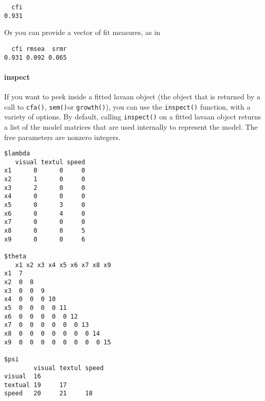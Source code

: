 \begin{verbatim}
  cfi 
0.931 
\end{verbatim}

Or you can provide a vector of fit measures, as in

\begin{Shaded}
\begin{Highlighting}[]
\NormalTok{(}\NormalTok{,}\NormalTok{,}\NormalTok{))}
\end{Highlighting}
\end{Shaded}

\begin{verbatim}
  cfi rmsea  srmr 
0.931 0.092 0.065 
\end{verbatim}

\hypertarget{inspect}{%
\paragraph{inspect}\label{inspect}}

If you want to peek inside a fitted lavaan object (the object that is
returned by a call to \texttt{cfa()}, \texttt{sem()}or
\texttt{growth()}), you can use the \texttt{inspect()} function, with a
variety of options. By default, calling \texttt{inspect()} on a fitted
lavaan object returns a list of the model matrices that are used
internally to represent the model. The free parameters are nonzero
integers.

\begin{Shaded}
\begin{Highlighting}[]
\StringTok{ }
\end{Highlighting}
\end{Shaded}

\begin{verbatim}
$lambda
   visual textul speed
x1      0      0     0
x2      1      0     0
x3      2      0     0
x4      0      0     0
x5      0      3     0
x6      0      4     0
x7      0      0     0
x8      0      0     5
x9      0      0     6

$theta
   x1 x2 x3 x4 x5 x6 x7 x8 x9
x1  7                        
x2  0  8                     
x3  0  0  9                  
x4  0  0  0 10               
x5  0  0  0  0 11            
x6  0  0  0  0  0 12         
x7  0  0  0  0  0  0 13      
x8  0  0  0  0  0  0  0 14   
x9  0  0  0  0  0  0  0  0 15

$psi
        visual textul speed
visual  16                 
textual 19     17          
speed   20     21     18   
\end{verbatim}

